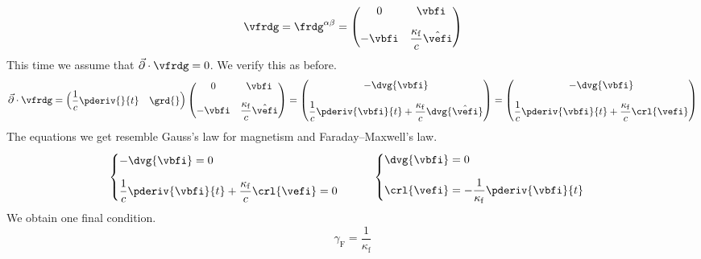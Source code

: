 \begin{equation}
  \vfrdg = \frdg^{\alpha\beta} = \begin{pmatrix} 0 & \vbfi \\[1em] - \vbfi & \dfrac{\kappa_\mathrm{f}}{c} \hat{\vefi} \\ \end{pmatrix}
\end{equation}
This time we assume that \(\vec{\partial} \cdot \vfrdg = 0 \). We verify this as before.
\[
\vec{\partial} \cdot \vfrdg = \begin{pmatrix}\displaystyle \frac{1}{c} \pderiv{}{t} & \grd{}\end{pmatrix} \begin{pmatrix} 0 & \vbfi \\[1em] - \vbfi & \dfrac{\kappa_\mathrm{f}}{c} \hat{\vefi} \\ \end{pmatrix}
 = \begin{pmatrix}\displaystyle -\dvg{\vbfi} \\[1em] \displaystyle \frac{1}{c} \pderiv{\vbfi}{t} + \frac{\kappa_\mathrm{f}}{c} \dvg{\hat{\vefi}} \end{pmatrix}
 = \begin{pmatrix}\displaystyle -\dvg{\vbfi} \\[1em] \displaystyle \frac{1}{c} \pderiv{\vbfi}{t} + \frac{\kappa_\mathrm{f}}{c} \crl{\vefi} \end{pmatrix}
\]
The equations we get resemble Gauss's law for magnetism and Faraday--Maxwell's law.
\[\begin{cases}
-\dvg{\vbfi} = 0 \\[1em]
\displaystyle \frac{1}{c} \pderiv{\vbfi}{t} + \frac{\kappa_\mathrm{f}}{c} \crl{\vefi} = 0
\end{cases} \qquad \begin{cases}
\dvg{\vbfi} = 0 \\[1em]
\displaystyle \crl{\vefi} = - \frac{1}{\kappa_\mathrm{f}} \pderiv{\vbfi}{t}
\end{cases}\]
We obtain one final condition.
\[\gamma_\mathrm{F} = \frac{1}{\kappa_\mathrm{f}}\]

